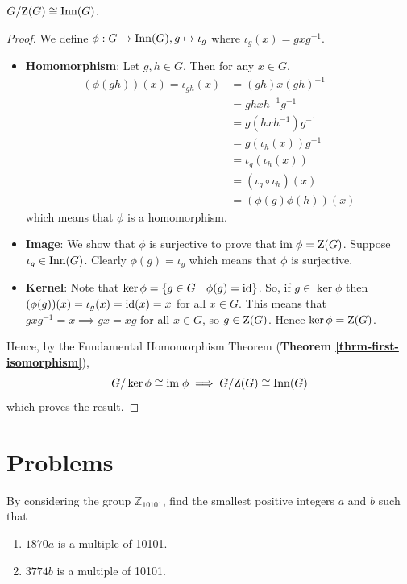 \begin{proposition}
    $G/\mathrm{Z}(G) \cong \mathrm{Inn}(G)$.
\end{proposition}
\begin{proof}
    We define $\phi: G \to \mathrm{Inn}(G), g \mapsto \iota_g$ where $\iota_g(x) = gxg^{-1}$.
    \begin{itemize}
        \item \textbf{Homomorphism}: Let $g, h \in G$. Then for any $x \in G$,
        \begin{align*}
            (\phi(gh))(x) = \iota_{gh}(x) &= (gh)x(gh)^{-1}\\
            &= ghxh^{-1}g^{-1}\\
            &= g(hxh^{-1})g^{-1}\\
            &= g(\iota_h(x))g^{-1}\\
            &=\iota_g(\iota_h(x))\\
            &=(\iota_g\circ\iota_h)(x)\\
            &=(\phi(g)\phi(h))(x)
        \end{align*}
        which means that $\phi$ is a homomorphism.

        \item \textbf{Image}: We show that $\phi$ is surjective to prove that $\mathrm{im}\; \phi = \mathrm{Z}(G)$. Suppose $\iota_g \in \mathrm{Inn}(G)$. Clearly $\phi(g) = \iota_g$  which means that $\phi$ is surjective.

        \item \textbf{Kernel}: Note that $\ker\phi = \{g \in G \ | \ \phi(g) = \mathrm{id}\}$. So, if $g \in \ker\phi$ then $(\phi(g))(x) = \iota_g(x) = \mathrm{id}(x) = x$ for all $x \in G$. This means that $gxg^{-1} = x \implies gx = xg$ for all $x \in G$, so $g \in \mathrm{Z}(G)$. Hence $\ker\phi = \mathrm{Z}(G)$.
    \end{itemize}
    Hence, by the Fundamental Homomorphism Theorem (\textbf{Theorem \ref{thrm-first-isomorphism}}),
    \[
        G/\ker\phi \cong \mathrm{im}\;\phi \implies G/\mathrm{Z}(G) \cong \mathrm{Inn}(G)
    \]
    which proves the result.
\end{proof}

\newpage

\section{Problems}
\begin{problem}
    By considering the group $\mathbb{Z}_{10101}$, find the smallest positive integers $a$ and $b$ such that
    \begin{enumerate}[label=(\alph*)]
        \item $1870a$ is a multiple of 10101.
        \item $3774b$ is a multiple of 10101.
    \end{enumerate}
\end{problem}

